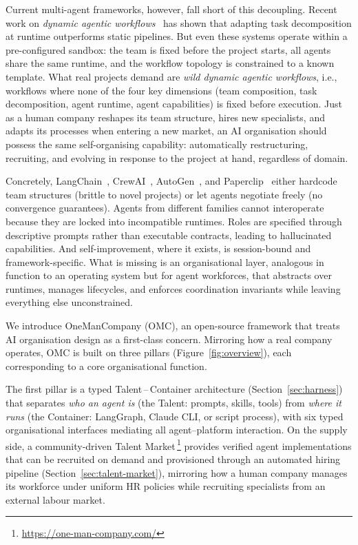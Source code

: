 \documentclass[11pt,a4paper]{article}
\begin{document}
Current multi-agent frameworks, however, fall short of this decoupling.  Recent work on \emph{dynamic agentic workflows}~\cite{wang2025tdag, erdogan2025planact, hu2025evomac} has shown that adapting task decomposition at runtime outperforms static pipelines.  But even these systems operate within a pre-configured sandbox: the team is fixed before the project starts, all agents share the same runtime, and the workflow topology is constrained to a known template.  What real projects demand are \emph{wild dynamic agentic workflows}, i.e., workflows where none of the four key dimensions (team composition, task decomposition, agent runtime, agent capabilities) is fixed before execution.  Just as a human company reshapes its team structure, hires new specialists, and adapts its processes when entering a new market, an AI organisation should possess the same self-organising capability: automatically restructuring, recruiting, and evolving in response to the project at hand, regardless of domain.

Concretely, LangChain~\cite{langchain2024deepagents}, CrewAI~\cite{crewai}, AutoGen~\cite{autogen}, and Paperclip~\cite{paperclip2025} either hardcode team structures (brittle to novel projects) or let agents negotiate freely (no convergence guarantees).  Agents from different families cannot interoperate because they are locked into incompatible runtimes.  Roles are specified through descriptive prompts rather than executable contracts, leading to hallucinated capabilities.  And self-improvement, where it exists, is session-bound and framework-specific.  What is missing is an organisational layer, analogous in function to an operating system but for agent workforces, that abstracts over runtimes, manages lifecycles, and enforces coordination invariants while leaving everything else unconstrained.

We introduce OneManCompany (OMC), an open-source framework that treats AI organisation design as a first-class concern.  Mirroring how a real company operates, OMC is built on three pillars (Figure~\ref{fig:overview}), each corresponding to a core organisational function.

The first pillar is a typed Talent\,--\,Container architecture (Section~\ref{sec:harness}) that separates \emph{who an agent is} (the Talent: prompts, skills, tools) from \emph{where it runs} (the Container: LangGraph, Claude CLI, or script process), with six typed organisational interfaces mediating all agent--platform interaction.  On the supply side, a community-driven Talent Market\,\footnote{\url{https://one-man-company.com/}} provides verified agent implementations that can be recruited on demand and provisioned through an automated hiring pipeline (Section~\ref{sec:talent-market}), mirroring how a human company manages its workforce under uniform HR policies while recruiting specialists from an external labour market.
\end{document}
